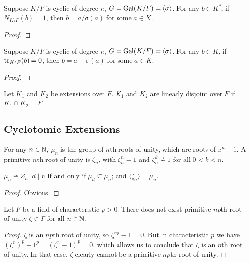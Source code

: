 \begin{theorem}
    Suppose \(K/F\) is cyclic of degree \(n\), \(G = \operatorname{Gal}(K/F) = \langle\sigma\rangle\).
    For any \(b \in K^\ast\), if \(N_{K/F}(b) = 1\),
    then \(b = a/\sigma(a)\) for some \(a \in K\).
\end{theorem}
\begin{proof}
\end{proof}
\begin{theorem}
    Suppose \(K/F\) is cyclic of degree \(n\), \(G = \operatorname{Gal}(K/F) = \langle\sigma\rangle\).
    For any \(b \in K\), if \(\tr_{K/F}(b) = 0\),
    then \(b = a - \sigma(a)\) for some \(a \in K\).
\end{theorem}
\begin{proof}
\end{proof}

\begin{definition}
    Let \(K_1\) and \(K_2\) be extensions over \(F\).
    \(K_1\) and \(K_2\) are linearly disjoint over \(F\)
    if \(K_1 \cap K_2 = F\).
\end{definition}

\subsection*{Cyclotomic Extensions}

\begin{definition}
    For any \(n \in \mathbb{N}\), \(\mu_n\) is the group of \(n\)th roots of unity,
    which are roots of \(x^n - 1\).
    A primitive \(n\)th root of unity is \(\zeta_n\),
    with \(\zeta_n^n = 1\) and \(\zeta_n^k \neq 1\) for all \(0 < k < n\).
\end{definition}
\begin{proposition}
    \(\mu_n \cong Z_n\);
    \(d \mid n\) if and only if \(\mu_d \subseteq \mu_n\);
    and \(\langle \zeta_n \rangle = \mu_n\).
\end{proposition}
\begin{proof}
    Obvious.
\end{proof}

\begin{proposition}
    Let \(F\) be a field of characteristic \(p > 0\).
    There does not exist primitive \(np\)th root of unity \(\zeta \in F\)
    for all \(n \in \mathbb{N}\).
\end{proposition}
\begin{proof}
    \(\zeta\) is an \(np\)th root of unity,
    so \(\zeta^{np} - 1 = 0\).
    But in characteristic \(p\) we have
    \({(\zeta^n)}^p - 1^p = {(\zeta^n - 1)}^p = 0\),
    which allows us to conclude that \(\zeta\) is an \(n\)th root of unity.
    In that case, \(\zeta\) clearly cannot be a primitive \(np\)th root of unity.
\end{proof}

